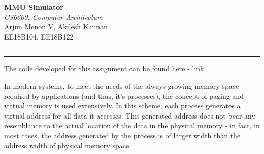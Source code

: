 \documentclass[12pt,a4paper,english]{paper}
\def \courseNumber {CS6600}
\def \courseName {Computer Architecture}
\def \assignmentName {MMU Simulator}
\def \myName {Arjun Menon V, Akilesh Kannan}
\def \rollNumber {EE18B104, EE18B122}
\newenvironment{warning}{%
  \def\FrameCommand{%
    \hspace{1pt}%
    {\color{red}\vrule width 2pt}%
    {\color{formalred}\vrule width 4pt}%
    \colorbox{formalred}%
  }%
  \MakeFramed{\advance\hsize-\width\FrameRestore}%
  \noindent\hspace{-4.55pt}%
  \begin{adjustwidth}{7pt}{}%
  \vspace{2pt}\vspace{2pt}%
}
{%
  \vspace{2pt}\end{adjustwidth}\endMakeFramed%
}
\begin{document}
 
\thispagestyle{empty}
\vspace{-4.5cm}

\hspace*{-\parindent}
\begin{minipage}{0.65\textwidth}
\fontsize{22pt}{10pt}\selectfont\textbf{\assignmentName}\\[1mm]
\Large
\textit{\courseNumber: \courseName}\\[5mm]
\Large \myName \\[1mm]
\normalsize \rollNumber \\
\end{minipage}\hfill%

\hrule \hrule
\medskip

\begin{warning}
The code developed for this assignment can be found here - \href{https://github.com/aklsh/MMU}{link}
\end{warning}

In modern systems, to meet the needs of the always-growing memory space required by applications (and thus, it's processes), the concept of paging and virtual memory is used extensively. In this scheme, each process generates a virtual address for all data it accesses. This generated address does not bear any resemblance to the actual location of the data in the physical memory - in fact, in most cases, the address generated by the process is of larger width than the address width of physical memory space.
\end{document}
